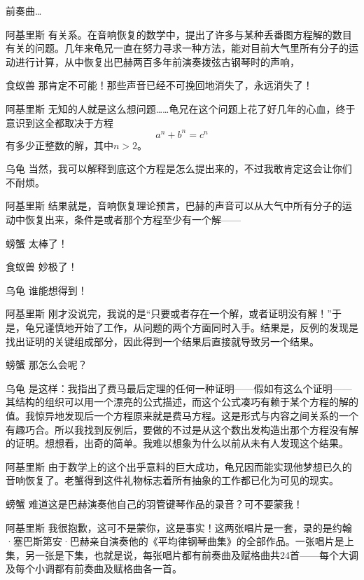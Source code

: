 \begin{dialog}{前奏曲…}
\begin{dialogue}
\item[阿基里斯]有关系。在音响恢复的数学中，提出了许多与某种丢番图方程解的数目有关的问题。几年来龟兄一直在努力寻求一种方法，能对目前大气里所有分子的运动进行计算，从中恢复出巴赫两百多年前演奏拨弦古钢琴时的声响，

\item[食蚁兽]那肯定不可能！那些声音已经不可挽回地消失了，永远消失了！

\item[阿基里斯]无知的人就是这么想问题……龟兄在这个问题上花了好几年的心血，终于意识到这全都取决于方程
\[
  a^n+b^n=c^n
\]
有多少正整数的解，其中$n>2$。

\item[乌龟]当然，我可以解释到底这个方程是怎么提出来的，不过我敢肯定这会让你们不耐烦。

\item[阿基里斯]结果就是，音响恢复理论预言，巴赫的声音可以从大气中所有分子的运动中恢复出来，条件是或者那个方程至少有一个解——

\item[螃蟹]太棒了！

\item[食蚁兽]妙极了！

\item[乌龟]谁能想得到！

\item[阿基里斯]刚才没说完，我说的是“只要或者存在一个解，或者证明没有解！”于是，龟兄谨慎地开始了工作，从问题的两个方面同时入手。结果是，反例的发现是找出证明的关键组成部分，因此得到一个结果后直接就导致另一个结果。

\item[螃蟹]那怎么会呢？

\item[乌龟]是这样：我指出了费马最后定理的任何一种证明——假如有这么个证明——其结构的组织可以用一个漂亮的公式描述，而这个公式凑巧有赖于某个方程的解的值。我惊异地发现后一个方程原来就是费马方程。这是形式与内容之间关系的一个有趣巧合。所以我找到反例后，要做的不过是从这个数出发构造出那个方程没有解的证明。想想看，出奇的简单。我难以想象为什么以前从未有人发现这个结果。

\item[阿基里斯]由于数学上的这个出乎意料的巨大成功，龟兄因而能实现他梦想已久的音响恢复了。老蟹得到这件礼物标志着所有抽象的工作都已化为可见的现实。

\item[螃蟹]难道这是巴赫演奏他自己的羽管键琴作品的录音？可不要蒙我！

\item[阿基里斯]我很抱歉，这可不是蒙你，这是事实！这两张唱片是一套，录的是约翰·塞巴斯第安·巴赫亲自演奏他的《平均律钢琴曲集》的全部作品。一张唱片是上集，另一张是下集，也就是说，每张唱片都有前奏曲及赋格曲共24首——每个大调及每个小调都有前奏曲及赋格曲各一首。


\end{dialogue}
\end{dialog}
